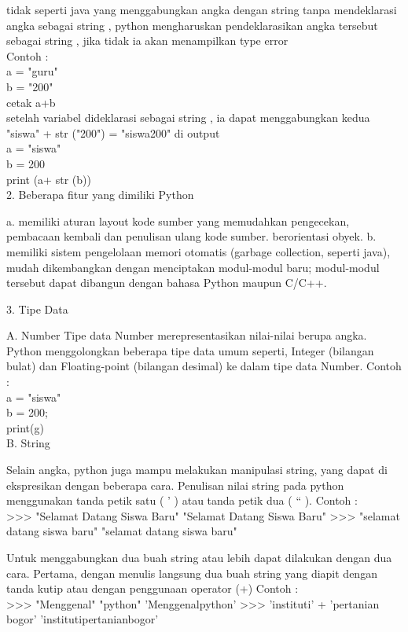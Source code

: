 \begin{enumerate}
    tidak seperti java yang menggabungkan angka dengan string tanpa mendeklarasi angka sebagai string , python mengharuskan pendeklarasikan angka tersebut sebagai string , jika tidak ia akan menampilkan type error\\
    Contoh :\\
    a = "guru"\\
    b = "200"\\
    cetak a+b\\
    
    setelah variabel dideklarasi sebagai string , ia dapat menggabungkan kedua "siswa" + str ("200") = "siswa200" di output\\
    a = "siswa"\\
    b = 200\\
    print (a+ str (b))\\
    
2. Beberapa fitur yang dimiliki Python
    
    a. memiliki aturan layout kode sumber yang memudahkan pengecekan, pembacaan kembali dan penulisan ulang kode sumber. berorientasi obyek. 
    b. memiliki sistem pengelolaan memori otomatis (garbage collection, seperti java), mudah dikembangkan dengan menciptakan modul-modul baru; modul-modul tersebut dapat dibangun dengan bahasa Python maupun C/C++.

3. Tipe Data

A. Number
    Tipe data Number merepresentasikan nilai-nilai berupa angka. Python menggolongkan beberapa tipe data umum seperti, Integer (bilangan bulat) dan Floating-point (bilangan desimal) ke dalam tipe data Number.
    Contoh :\\
    a = "siswa"\\
    b = 200;\\
    print(g)\\
    
B. String
    
    Selain angka, python juga mampu melakukan manipulasi string, yang dapat di ekspresikan dengan beberapa cara. Penulisan nilai string pada python menggunakan tanda petik satu ( ' ) atau tanda petik dua ( “ ).
    Contoh :\\
    >>> "Selamat Datang Siswa Baru"
    "Selamat Datang Siswa Baru"
    >>> "selamat datang siswa baru"
    "selamat datang siswa baru"
    
    Untuk menggabungkan dua buah string atau lebih dapat dilakukan dengan dua cara. Pertama, dengan menulis langsung dua buah string yang diapit dengan tanda kutip atau dengan penggunaan operator (+)
    Contoh :\\
    >>> "Menggenal" "python"
    'Menggenalpython'
    >>> 'instituti' + 'pertanian bogor'
    'institutipertanianbogor'
    

\end{enumerate}
